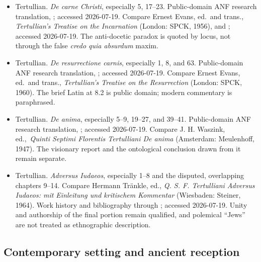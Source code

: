 \begin{itemize}
\item Tertullian. \emph{De carne Christi}, especially 5, 17--23.
Public-domain ANF research translation,
; accessed
2026-07-19. Compare Ernest Evans, ed.~and trans., \emph{Tertullian's Treatise on
the Incarnation} (London: SPCK, 1956), and
; accessed
2026-07-19. The anti-docetic paradox is quoted by locus, not through the false
\emph{credo quia absurdum} maxim.

\item Tertullian. \emph{De resurrectione carnis}, especially 1, 8, and 63.
Public-domain ANF research translation,
; accessed
2026-07-19. Compare Ernest Evans, ed.~and trans., \emph{Tertullian's Treatise on
the Resurrection} (London: SPCK, 1960). The brief Latin at 8.2 is public domain;
modern commentary is paraphrased.

\item Tertullian. \emph{De anima}, especially 5--9, 19--27, and 39--41.
Public-domain ANF research translation,
; accessed
2026-07-19. Compare J. H. Waszink, ed.,~\emph{Quinti Septimi Florentis
Tertulliani De anima} (Amsterdam: Meulenhoff, 1947). The visionary report and
the ontological conclusion drawn from it remain separate.

\item Tertullian. \emph{Adversus Iudaeos}, especially 1--8 and the disputed,
overlapping chapters 9--14. Compare Hermann Tr\"ankle, ed., \emph{Q. S. F.
Tertulliani Adversus Iudaeos: mit Einleitung und kritischem Kommentar}
(Wiesbaden: Steiner, 1964). Work history and bibliography through
; accessed 2026-07-19. Unity and authorship of the
final portion remain qualified, and polemical ``Jews'' are not treated as
ethnographic description.
\end{itemize}

\subsection{Contemporary setting and ancient reception}

